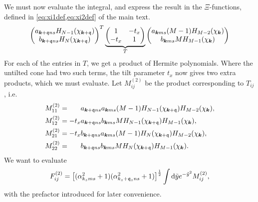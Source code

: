 We must now evaluate the integral, and express the result in the \( \Xi \)-functions, defined in \cref{eq:xi1def,eq:xi2def} of the main text.
\[
    \begin{pmatrix}
      a_{\bm{k} + \mathfrak{q} n s} H_{N-1} ( \chi _{\bm{k} + \mathfrak{q}} )\\
      b_{\bm{k} + \mathfrak{q} ns} H_N ( \chi _{\bm{k} + \mathfrak{q}} )
    \end{pmatrix}^{T}
  \underbrace{
    \begin{pmatrix}
      1 & -t_x\\
      -t_x & 1
    \end{pmatrix}
    }_{T}
    \begin{pmatrix}
      a_{\bm{k} m s} (M-1) H_{M-2} (\chi_{\bm{k}})\\
      b_{\bm{k} m s} M H_{M-1} ( \chi _{\bm{k}} )
    \end{pmatrix}
\]
For each of the entries in \( T \), we get a product of Hermite polynomials.
Where the untilted cone had two such terms, the tilt parameter \( t _x \) now gives two extra products, which we must evaluate.
Let \( M^{(2)}_{ij} \) be the product corresponding to \( T_{ij} \), i.e.
\begin{align}
  M^{(2)}_{11} &= \phantom{-t_x} a_{\bm{k} + \mathfrak{q} ns} a_{\bm{k} ms} (M-1) H_{N-1} (\chi_{\bm{k} + \mathfrak{q}}) H_{M-2} (\chi_{\bm{k}}),\\
  M^{(2)}_{12} &= -t_x a_{\bm{k} + \mathfrak{q} ns} b_{\bm{k} ms} M H_{N-1} (\chi_{\bm{k} + \mathfrak{q}}) H_{M-1} (\chi_{\bm{k}}),\\
  M^{(2)}_{21} &= -t_x b_{\bm{k} + \mathfrak{q} ns} a_{\bm{k} ms} ( M-1 ) H_{N} (\chi_{\bm{k} + \mathfrak{q}}) H_{M-2} (\chi_{\bm{k}}),\\
  M^{(2)}_{22} &= \phantom{-t_x} b_{\bm{k} + \mathfrak{q} ns} b_{\bm{k} ms} M H_N (\chi_{\bm{k} + \mathfrak{q}}) H_{M-1} (\chi_{\bm{k}}).
\end{align}
We want to evaluate
\begin{equation}
  \label{eq:147}
  F^{(2)}_{ij} =
  \left[(\alpha_{k_z m s}^2 + 1) ( \alpha_{k_z + \mathfrak{q}_z n s}^2 + 1 )\right]^{\frac{1}{2}}
  \int \mathrm{d} \tilde{y}
  e^{-\tilde{y}^2}
  M^{(2)}_{ij},
\end{equation}
with the prefactor introduced for later convenience.

